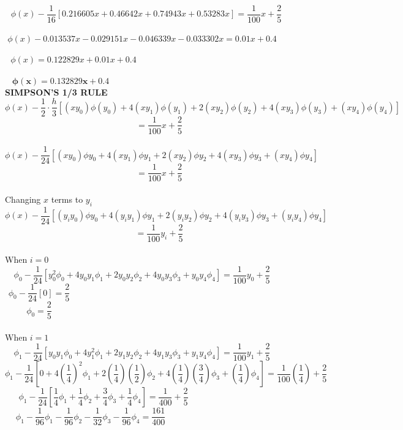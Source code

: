 \documentclass[a4paper,12pt]{report}
\newcommand{\bt}[1]{\textbf{#1}}
\newcommand{\spn}[1]{\\[#1cm]}
\newcommand{\NI}{\noindent}
\begin{document}
	$$
		\phi(x) - \frac{1}{16}\left[0.216605x  + 0.46642x + 0.74943x + 0.53283x\right]= \frac{1}{100}x +\frac{2}{5}\qquad\quad
	$$
	\spn{-1.2}
	$$
		\phi(x) - 0.013537x  -0.029151x - 0.046339x - 0.033302x =  0.01x + 0.4\qquad\qquad
	$$
	\spn{-1.2}
	$$
		\phi(x) = 0.122829x + 0.01x + 0.4\qquad\quad\qquad\qquad\qquad\qquad\qquad\qquad\qquad\qquad\quad
	$$
	\spn{-1.4}
	$$
		\mathbf{\phi(x) = 0.132829x + 0.4\qquad\quad\qquad\qquad\qquad\qquad\qquad\qquad\qquad\qquad\qquad \qquad}
	$$
	\newpage
	\NI\bt{SIMPSON'S 1/3 RULE}
	$$
	\phi(x) - \frac{1}{2} \cdot \frac{h}{3} \left[(xy_0)\phi(y_0) + 4(xy_1)\phi(y_1) + 2(xy_2)\phi(y_2) + 4(xy_3)\phi(y_3)+(xy_4)\phi(y_4)\right] 
	$$
	$$
	= \frac{1}{100}x + \frac{2}{5}
	$$\spn{-0.8}
	$$
	\phi(x) - \frac{1}{24}\left[(xy_0)\phi y_0 + 4(xy_1)\phi y_1 + 2(xy_2)\phi y_2 + 4(xy_3)\phi y_3 +(xy_4)\phi y_4 \right] \qquad\quad
	$$
	\begin{equation}
		= \frac{1}{100}x + \frac{2}{5} \tag{5} \label{eq:h}
	\end{equation}
	\spn{-0.8}
	Changing $x$ terms to $y_i$
	$$
		\phi(x) - \frac{1}{24}\left[(y_iy_0)\phi y_0 + 4(y_iy_1)\phi y_1 + 2(y_iy_2)\phi y_2 + 4(y_iy_3)\phi y_3 +(y_iy_4)\phi y_4 \right] 
	$$
	$$
		= \frac{1}{100}y_i + \frac{2}{5}
	$$\spn{-0.8}
	When $i=0$
	$$
		\phi_0 - \frac{1}{24} \left[y_0^2 \phi_0 + 4y_0y_1\phi_1 + 2y_0y_2\phi_2 + 4y_0y_3\phi_3 + y_0y_4\phi_4\right]	= \frac{1}{100}y_0 + \frac{2}{5}\qquad\qquad
	$$
	$$
		\phi_0 - \frac{1}{24} \left[0\right] = \frac{2}{5}\qquad\qquad\qquad\qquad\qquad\qquad\qquad\qquad\qquad\qquad\qquad\qquad\qquad\qquad
	$$
	\begin{equation}
		\phi_0 = \frac{2}{5}\qquad\qquad\qquad\qquad\qquad\qquad\qquad\qquad\qquad\qquad\qquad\qquad\qquad\quad\quad \tag{i}
	\end{equation}
	\spn{-0.7}When $i=1$
	$$
	\phi_1 - \frac{1}{24} \left[y_0y_1 \phi_0 + 4y_1^2\phi_1 + 2y_1y_2\phi_2 + 4y_1y_3\phi_3 + y_1y_4\phi_4\right]	= \frac{1}{100}y_1 + \frac{2}{5}\qquad\qquad
	$$
	$$
		\phi_1 - \frac{1}{24} \left[0 + 4\left(\frac{1}{4}\right)^2\phi_1 + 2\left(\frac{1}{4}\right)\left(\frac{1}{2}\right)\phi_2 + 4\left(\frac{1}{4}\right)\left(\frac{3}{4}\right)\phi_3 + \left(\frac{1}{4}\right)\phi_4\right] = \frac{1}{100}\left(\frac{1}{4}\right)+\frac{2}{5}
	$$
	$$
		\phi_1 - \frac{1}{24} \left[\frac{1}{4}\phi_1 +\frac{1}{4}\phi_2 + \frac{3}{4}\phi_3 + \frac{1}{4}\phi_4\right] = \frac{1}{400}+\frac{2}{5} \qquad\qquad\qquad\qquad\qquad\qquad\quad
	$$
	$$
		\phi_1 - \frac{1}{96}\phi_1 -\frac{1}{96}\phi_2 - \frac{1}{32}\phi_3 - \frac{1}{96}\phi_4 = \frac{161}{400} \qquad\qquad\qquad\qquad\qquad\qquad\quad\qquad\quad
	$$
\end{document}

